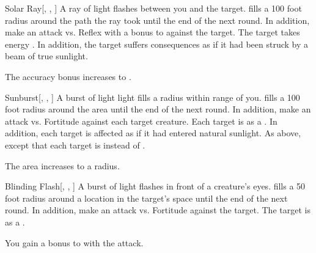 \lowercase{\hypertarget{spell:Solar Ray}{}}\label{spell:Solar Ray}
\begin{freeability}[Rank 5]{\hypertarget{spell:Solar Ray}{Solar Ray}}[, , ]
A ray of light flashes between you and the target.
 fills a 100 foot radius around the path the ray took until the end of the next round.
In addition, make an attack vs. Reflex with a  bonus to  against the target.
\hit The target takes energy .
In addition, the target suffers consequences as if it had been struck by a beam of true sunlight.

\rankline
{} The accuracy bonus increases to .
\end{freeability}
\vspace{0.25em}



\lowercase{\hypertarget{spell:Sunburst}{}}\label{spell:Sunburst}
\begin{freeability}[Rank 5]{\hypertarget{spell:Sunburst}{Sunburst}}[, , ]
A burst of light light fills a \areamed radius  within \rngmed range of you.
 fills a 100 foot radius around the area until the end of the next round.
In addition, make an attack vs. Fortitude against each target creature.
\hit Each target is  as a .
In addition, each target is affected as if it had entered natural sunlight.
\crit As above, except that each target is  instead of .

\rankline
{} The area increases to a \arealarge radius.
\end{freeability}
\vspace{0.25em}



\lowercase{\hypertarget{spell:Blinding Flash}{}}\label{spell:Blinding Flash}
\begin{freeability}[Rank 6]{\hypertarget{spell:Blinding Flash}{Blinding Flash}}[, , ]
A burst of light flashes in front of a creature's eyes.
 fills a 50 foot radius around a location in the target's space until the end of the next round.
In addition, make an attack vs. Fortitude against the target.
\hit The target is  as a .

\rankline
{} You gain a  bonus to  with the attack.
\end{freeability}
\vspace{0.25em}



